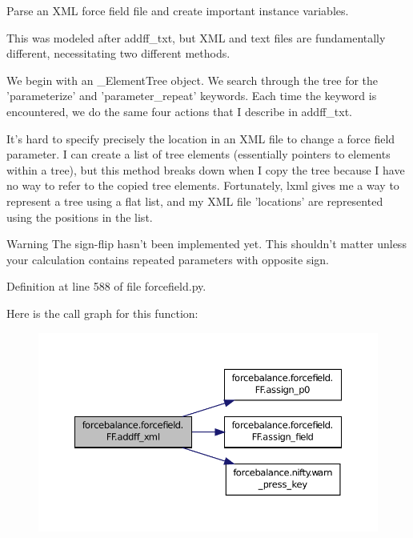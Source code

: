 Parse an X\-M\-L force field file and create important instance variables. 

This was modeled after addff\-\_\-txt, but X\-M\-L and text files are fundamentally different, necessitating two different methods.

We begin with an \-\_\-\-Element\-Tree object. We search through the tree for the 'parameterize' and 'parameter\-\_\-repeat' keywords. Each time the keyword is encountered, we do the same four actions that I describe in addff\-\_\-txt.

It's hard to specify precisely the location in an X\-M\-L file to change a force field parameter. I can create a list of tree elements (essentially pointers to elements within a tree), but this method breaks down when I copy the tree because I have no way to refer to the copied tree elements. Fortunately, lxml gives me a way to represent a tree using a flat list, and my X\-M\-L file 'locations' are represented using the positions in the list.

\begin{DoxyWarning}{Warning}
The sign-\/flip hasn't been implemented yet. This shouldn't matter unless your calculation contains repeated parameters with opposite sign. 
\end{DoxyWarning}


Definition at line 588 of file forcefield.\-py.



Here is the call graph for this function\-:
\nopagebreak
\begin{figure}[H]
\begin{center}
\leavevmode
\includegraphics[width=350pt]{classforcebalance_1_1forcefield_1_1FF_aaed8b2b725141c301f58016c80acec27_cgraph}
\end{center}
\end{figure}


